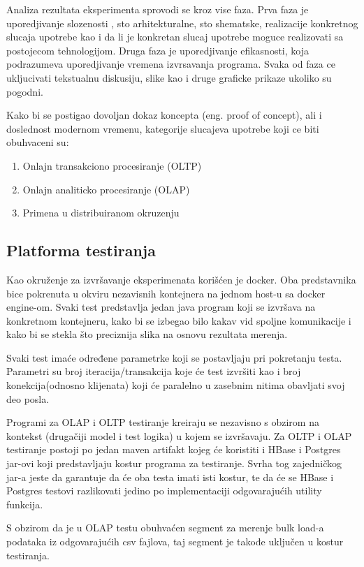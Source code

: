 \documentclass[12pt,oneside]{memoir}
\begin{document}
Analiza rezultata eksperimenta sprovodi se kroz vise faza. Prva faza je uporedjivanje slozenosti , sto arhitekturalne, sto shematske, realizacije konkretnog slucaja upotrebe kao i da li je konkretan slucaj upotrebe moguce realizovati sa postojecom tehnologijom. Druga faza je uporedjivanje efikasnosti, koja podrazumeva uporedjivanje vremena izvrsavanja programa.  Svaka od faza ce ukljucivati tekstualnu diskusiju, slike kao i druge graficke prikaze ukoliko su pogodni.

Kako bi se postigao dovoljan dokaz koncepta (eng. proof of concept), ali i doslednost modernom
vremenu, kategorije slucajeva upotrebe koji ce biti obuhvaceni su:
\begin{enumerate}
\item Onlajn transakciono procesiranje (OLTP)
\item Onlajn analiticko procesiranje (OLAP)
\item Primena u distribuiranom okruzenju
\end{enumerate}

\subsection{Platforma testiranja}

Kao okruženje za izvršavanje eksperimenata korišćen je docker.  Oba predstavnika bice pokrenuta u okviru nezavisnih kontejnera na jednom host-u sa docker engine-om. Svaki test predstavlja jedan java program koji se izvršava na konkretnom kontejneru, kako bi se izbegao bilo kakav vid spoljne komunikacije i kako bi se stekla što preciznija slika na osnovu rezultata merenja.  

Svaki test imaće određene parametrke koji se postavljaju pri pokretanju testa. Parametri su broj iteracija/transakcija koje će test izvršiti kao i broj konekcija(odnosno klijenata) koji će paralelno u zasebnim nitima obavljati svoj deo posla.

Programi za OLAP i OLTP testiranje kreiraju se nezavisno s obzirom na kontekst (drugačiji model i test logika) u kojem se izvršavaju. Za OLTP i OLAP testiranje postoji po jedan maven artifakt kojeg će koristiti i HBase i Postgres jar-ovi koji predstavljaju kostur programa za testiranje. Svrha tog zajedničkog jar-a jeste da garantuje da će oba testa imati isti kostur, te da će se HBase i Postgres testovi razlikovati jedino po implementaciji  odgovarajućih utility funkcija. 


S obzirom da je u OLAP testu obuhvaćen segment za merenje bulk load-a podataka iz odgovarajućih csv fajlova, taj segment je takođe uključen u kostur testiranja.
\end{document}
